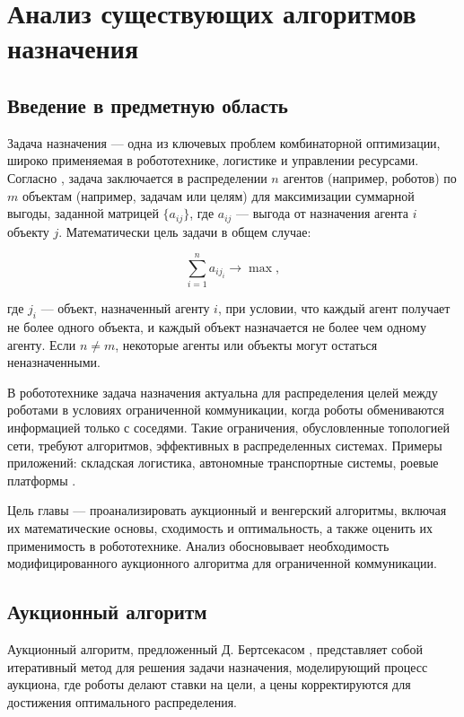 \chapter{Анализ существующих алгоритмов назначения}
\label{ch:analysis}

\section{Введение в предметную область}
Задача назначения --- одна из ключевых проблем комбинаторной оптимизации, широко применяемая в робототехнике, логистике и управлении ресурсами. Согласно \cite{bertsekas1990}, задача заключается в распределении \( n \) агентов (например, роботов) по \( m \) объектам (например, задачам или целям) для максимизации суммарной выгоды, заданной матрицей \( \{a_{ij}\} \), где \( a_{ij} \) --- выгода от назначения агента \( i \) объекту \( j \). Математически цель задачи в общем случае:

\[
\sum_{i=1}^n a_{i j_i} \to \max,
\]

где \( j_i \) --- объект, назначенный агенту \( i \), при условии, что каждый агент получает не более одного объекта, и каждый объект назначается не более чем одному агенту. Если \( n \neq m \), некоторые агенты или объекты могут остаться неназначенными.

В робототехнике задача назначения актуальна для распределения целей между роботами в условиях ограниченной коммуникации, когда роботы обмениваются информацией только с соседями. Такие ограничения, обусловленные топологией сети, требуют алгоритмов, эффективных в распределенных системах. Примеры приложений: складская логистика, автономные транспортные системы, роевые платформы \cite{kalyaev2009, gerkey2003}.

Цель главы --- проанализировать аукционный и венгерский алгоритмы, включая их математические основы, сходимость и оптимальность, а также оценить их применимость в робототехнике. Анализ обосновывает необходимость модифицированного аукционного алгоритма для ограниченной коммуникации.


\section{Аукционный алгоритм}
Аукционный алгоритм, предложенный Д. Бертсекасом \cite{bertsekas1990}, представляет собой итеративный метод для решения задачи назначения, моделирующий процесс аукциона, где роботы делают ставки на цели, а цены корректируются для достижения оптимального распределения.

